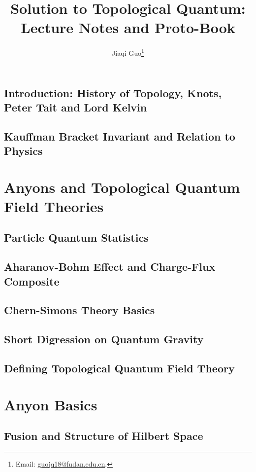\documentclass{book}
\title{Solution to Topological Quantum: Lecture Notes and Proto-Book}
\author{Jiaqi Guo\footnote{Email: \href{mailto:guojq18@fudan.edu.cn}{guojq18@fudan.edu.cn}.}}
\begin{document}
\maketitle
\tableofcontents

\chapter{Introduction: History of Topology, Knots, Peter Tait and Lord Kelvin}

\chapter{Kauffman Bracket Invariant and Relation to Physics}


\part{Anyons and Topological Quantum Field Theories}

\chapter{Particle Quantum Statistics}


\chapter{Aharanov-Bohm Effect and Charge-Flux Composite}
    

\chapter{Chern-Simons Theory Basics}


\chapter{Short Digression on Quantum Gravity}
\chapter{Defining Topological Quantum Field Theory}

\part{Anyon Basics}

\chapter{Fusion and Structure of Hilbert Space}

\end{document}
